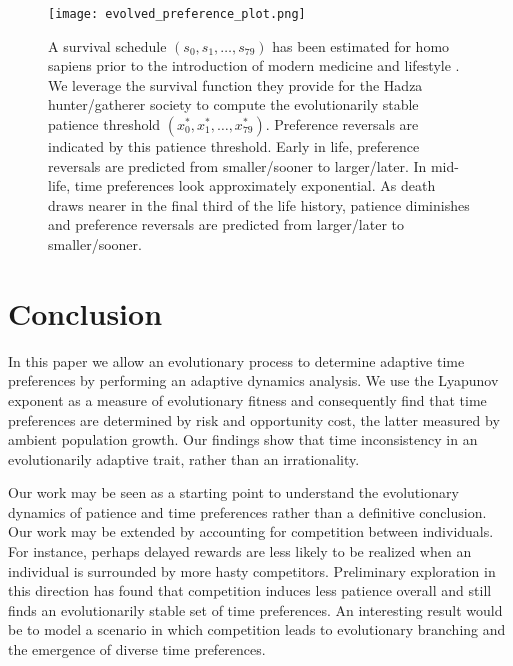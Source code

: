 \documentclass[titlepage, hidelinks, 12pt]{article}
\theoremstyle{plain}
\theoremstyle{remark}
\theoremstyle{definition}
\begin{document}
\begin{figure}[h]
    \centering
    \texttt{[image: evolved\_preference\_plot.png]}
    \caption[Induced time preferences from an average evolutionary life history.]{A survival schedule  $(s_0, s_1, \ldots, s_{79})$
        has been estimated for homo sapiens prior to the introduction of modern medicine and lifestyle \cite{gurven07}. We leverage
        the survival function they provide for the Hadza hunter/gatherer society to compute the evolutionarily stable patience 
        threshold $(x_0^*, x_1^*, \ldots, x_{79}^*)$. Preference reversals are indicated by this patience threshold.  
        Early in life,
        preference reversals are predicted from smaller/sooner to larger/later. In mid-life, time preferences look approximately exponential. As death
        draws nearer in the final third of the life history, patience diminishes and preference reversals are predicted from larger/later 
        to smaller/sooner.}
\end{figure}























\section{Conclusion}
In this paper we allow an evolutionary process to determine 
adaptive time preferences by performing an adaptive dynamics analysis. We use the Lyapunov exponent as 
a measure of evolutionary fitness and consequently find that time preferences are determined by risk and opportunity cost, the latter
measured by ambient population growth. Our findings show that time inconsistency in an evolutionarily adaptive trait, rather than an
irrationality. 

Our work may be seen as a starting point to understand the evolutionary dynamics of patience and time preferences rather
than a definitive conclusion. Our work may be extended by accounting for competition between individuals. For instance, perhaps
delayed rewards are less likely to be realized when an individual is surrounded by more hasty competitors. 
Preliminary exploration in this direction has found that competition induces less patience overall and still finds an evolutionarily stable
set of time preferences. An interesting result would be to model a scenario in which competition leads to evolutionary branching and the emergence
of diverse time preferences. 
\end{document}
